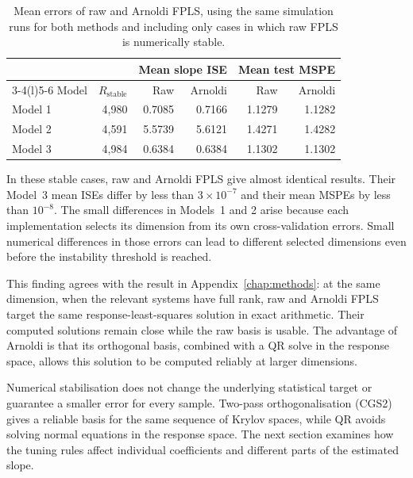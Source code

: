 \begin{table}[htbp]
    \centering
    \small
    \caption[Raw and Arnoldi errors on the paired stable subset]{Mean errors of raw and Arnoldi FPLS, using the same simulation
    runs for both methods and including only cases in which raw FPLS is
    numerically stable.}
    \label{tab:results-stable-pair}
    \begin{tabular}{@{}lrrrrr@{}}
        \toprule
        & & \multicolumn{2}{c}{Mean slope ISE}
          & \multicolumn{2}{c}{Mean test MSPE} \\
        \cmidrule(lr){3-4}\cmidrule(l){5-6}
        Model & $R_{\mathrm{stable}}$ & Raw & Arnoldi & Raw & Arnoldi \\
        \midrule
        Model 1 & 4,980 & 0.7085 & 0.7166 & 1.1279 & 1.1282 \\
        Model 2 & 4,591 & 5.5739 & 5.6121 & 1.4271 & 1.4282 \\
        Model 3 & 4,984 & 0.6384 & 0.6384 & 1.1302 & 1.1302 \\
        \bottomrule
    \end{tabular}
\end{table}

In these stable cases, raw and Arnoldi FPLS give almost identical results.
Their Model~3 mean ISEs differ by less than $3\times10^{-7}$ and their mean
MSPEs by less than $10^{-8}$.  The small differences in Models~1 and 2 arise
because each implementation selects its dimension from its own
cross-validation errors.  Small numerical differences in those errors can
lead to different selected dimensions even before the instability threshold
is reached.

This finding agrees with the result in Appendix~\ref{chap:methods}: at the
same dimension, when the relevant systems have full rank, raw and Arnoldi
FPLS target the same response-least-squares solution in exact arithmetic.
Their computed solutions remain close while the raw basis is usable.  The
advantage of Arnoldi is that its orthogonal basis, combined with a QR solve
in the response space, allows this solution to be computed reliably at
larger dimensions.

Numerical stabilisation does not change the underlying statistical target
or guarantee a smaller error for every sample.  Two-pass orthogonalisation
(CGS2) gives a reliable basis for the same sequence of Krylov spaces, while
QR avoids solving normal equations in the response space.  The next section
examines how the tuning rules affect individual coefficients and different
parts of the estimated slope.

